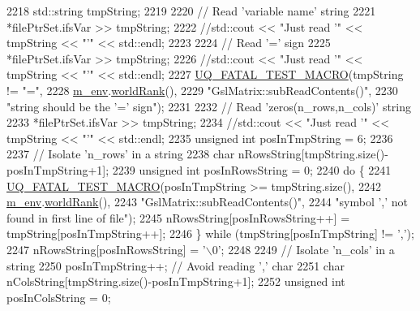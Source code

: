\begin{DoxyCode}
2218     std::string tmpString;
2219 
2220     \textcolor{comment}{// Read 'variable name' string}
2221     *filePtrSet.ifsVar >> tmpString;
2222     \textcolor{comment}{//std::cout << "Just read '" << tmpString << "'" << std::endl;}
2223 
2224     \textcolor{comment}{// Read '=' sign}
2225     *filePtrSet.ifsVar >> tmpString;
2226     \textcolor{comment}{//std::cout << "Just read '" << tmpString << "'" << std::endl;}
2227     \hyperlink{_defines_8h_a56d63d18d0a6d45757de47fcc06f574d}{UQ\_FATAL\_TEST\_MACRO}(tmpString != \textcolor{stringliteral}{"="},
2228                         \hyperlink{class_q_u_e_s_o_1_1_matrix_a247fb0fc0b87fecdee054bb4660b68e8}{m\_env}.\hyperlink{class_q_u_e_s_o_1_1_base_environment_a78b57112bbd0e6dd0e8afec00b40ffa7}{worldRank}(),
2229                         \textcolor{stringliteral}{"GslMatrix::subReadContents()"},
2230                         \textcolor{stringliteral}{"string should be the '=' sign"});
2231 
2232     \textcolor{comment}{// Read 'zeros(n\_rows,n\_cols)' string}
2233     *filePtrSet.ifsVar >> tmpString;
2234     \textcolor{comment}{//std::cout << "Just read '" << tmpString << "'" << std::endl;}
2235     \textcolor{keywordtype}{unsigned} \textcolor{keywordtype}{int} posInTmpString = 6;
2236 
2237     \textcolor{comment}{// Isolate 'n\_rows' in a string}
2238     \textcolor{keywordtype}{char} nRowsString[tmpString.size()-posInTmpString+1];
2239     \textcolor{keywordtype}{unsigned} \textcolor{keywordtype}{int} posInRowsString = 0;
2240     \textcolor{keywordflow}{do} \{
2241       \hyperlink{_defines_8h_a56d63d18d0a6d45757de47fcc06f574d}{UQ\_FATAL\_TEST\_MACRO}(posInTmpString >= tmpString.size(),
2242                           \hyperlink{class_q_u_e_s_o_1_1_matrix_a247fb0fc0b87fecdee054bb4660b68e8}{m\_env}.\hyperlink{class_q_u_e_s_o_1_1_base_environment_a78b57112bbd0e6dd0e8afec00b40ffa7}{worldRank}(),
2243                           \textcolor{stringliteral}{"GslMatrix::subReadContents()"},
2244                           \textcolor{stringliteral}{"symbol ',' not found in first line of file"});
2245       nRowsString[posInRowsString++] = tmpString[posInTmpString++];
2246     \} \textcolor{keywordflow}{while} (tmpString[posInTmpString] != \textcolor{charliteral}{','});
2247     nRowsString[posInRowsString] = \textcolor{charliteral}{'\(\backslash\)0'};
2248 
2249     \textcolor{comment}{// Isolate 'n\_cols' in a string}
2250     posInTmpString++; \textcolor{comment}{// Avoid reading ',' char}
2251     \textcolor{keywordtype}{char} nColsString[tmpString.size()-posInTmpString+1];
2252     \textcolor{keywordtype}{unsigned} \textcolor{keywordtype}{int} posInColsString = 0;

\end{DoxyCode}
